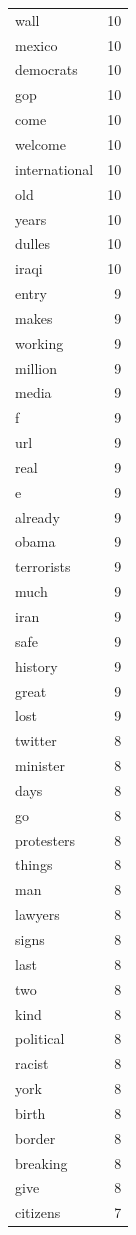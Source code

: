 \begin{tabular}{lr}
wall & 10 \\
mexico & 10 \\
democrats & 10 \\
gop & 10 \\
come & 10 \\
welcome & 10 \\
international & 10 \\
old & 10 \\
years & 10 \\
dulles & 10 \\
iraqi & 10 \\
entry & 9 \\
makes & 9 \\
working & 9 \\
million & 9 \\
media & 9 \\
f & 9 \\
url & 9 \\
real & 9 \\
e & 9 \\
already & 9 \\
obama & 9 \\
terrorists & 9 \\
much & 9 \\
iran & 9 \\
safe & 9 \\
history & 9 \\
great & 9 \\
lost & 9 \\
twitter & 8 \\
minister & 8 \\
days & 8 \\
go & 8 \\
protesters & 8 \\
things & 8 \\
man & 8 \\
lawyers & 8 \\
signs & 8 \\
last & 8 \\
two & 8 \\
kind & 8 \\
political & 8 \\
racist & 8 \\
york & 8 \\
birth & 8 \\
border & 8 \\
breaking & 8 \\
give & 8 \\
citizens & 7 \\

\end{tabular}
